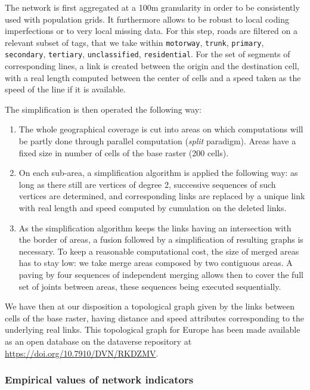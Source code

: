 \documentclass[11pt]{article}
\begin{document}
The network is first aggregated at a 100m granularity in order to be consistently used with population grids. It furthermore allows to be robust to local coding imperfections or to very local missing data. For this step, roads are filtered on a relevant subset of tags, that we take within \texttt{motorway}, \texttt{trunk}, \texttt{primary}, \texttt{secondary}, \texttt{tertiary}, \texttt{unclassified}, \texttt{residential}. For the set of segments of corresponding lines, a link is created between the origin and the destination cell, with a real length computed between the center of cells and a speed taken as the speed of the line if it is available.

The simplification is then operated the following way:
\begin{enumerate}
\item The whole geographical coverage is cut into areas on which computations will be partly done through parallel computation (\emph{split} paradigm). Areas have a fixed size in number of cells of the base raster (200 cells).
\item On each sub-area, a simplification algorithm is applied the following way: as long as there still are vertices of degree 2, successive sequences of such vertices are determined, and corresponding links are replaced by a unique link with real length and speed computed by cumulation on the deleted links.
\item As the simplification algorithm keeps the links having an intersection with the border of areas, a fusion followed by a simplification of resulting graphs is necessary. To keep a reasonable computational cost, the size of merged areas has to stay low: we take merge areas composed by two contiguous areas. A paving by four sequences of independent merging allows then to cover the full set of joints between areas, these sequences being executed sequentially.
\end{enumerate}


We have then at our disposition a topological graph given by the links between cells of the base raster, having distance and speed attributes corresponding to the underlying real links. This topological graph for Europe has been made available as an open database on the dataverse repository at \url{https://doi.org/10.7910/DVN/RKDZMV}.



\subsubsection{Empirical values of network indicators}
\end{document}
